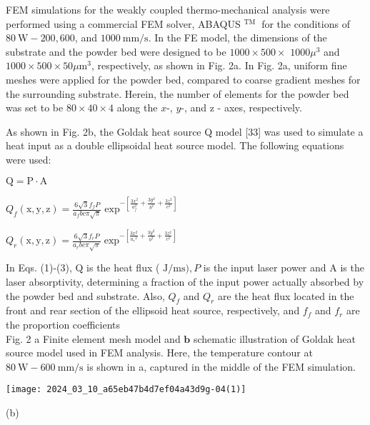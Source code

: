 \documentclass[10pt]{article}
\begin{document}
FEM simulations for the weakly coupled thermo-mechanical analysis were performed using a commercial FEM solver, ABAQUS ${ }^{\text {TM }}$ for the conditions of $80 \mathrm{~W}-200,600$, and $1000 \mathrm{~mm} / \mathrm{s}$. In the FE model, the dimensions of the substrate and the powder bed were designed to be $1000 \times 500 \times$ $1000 \mu^{3}$ and $1000 \times 500 \times 50 \mu \mathrm{m}^{3}$, respectively, as shown in Fig. 2a. In Fig. 2a, uniform fine meshes were applied for the powder bed, compared to coarse gradient meshes for the surrounding substrate. Herein, the number of elements for the powder bed was set to be $80 \times 40 \times 4$ along the $x$-, $y$-, and $\mathrm{z}$ - axes, respectively.

As shown in Fig. 2b, the Goldak heat source Q model [33] was used to simulate a heat input as a double ellipsoidal heat source model. The following equations were used:

$\mathrm{Q}=\mathrm{P} \cdot \mathrm{A}$

$Q_{f}(\mathrm{x}, \mathrm{y}, \mathrm{z})=\frac{6 \sqrt{3} f_{f} P}{a_{f} b c \pi \sqrt{\pi}} \exp ^{-\left[\frac{3 x^{2}}{a_{f}^{2}}+\frac{3 y^{2}}{b^{2}}+\frac{3 z^{2}}{c^{2}}\right]}$

$Q_{r}(\mathrm{x}, \mathrm{y}, \mathrm{z})=\frac{6 \sqrt{3} f_{r} P}{a_{r} b c \pi \sqrt{\pi}} \exp ^{-\left[\frac{3 x^{2}}{a_{r}{ }^{2}}+\frac{3 y^{2}}{b^{2}}+\frac{3 z^{2}}{c^{2}}\right]}$

In Eqs. (1)-(3), $\mathrm{Q}$ is the heat flux ( $\mathrm{J} / \mathrm{ms}), P$ is the input laser power and $\mathrm{A}$ is the laser absorptivity, determining a fraction of the input power actually absorbed by the powder bed and substrate. Also, $Q_{f}$ and $Q_{r}$ are the heat flux located in the front and rear section of the ellipsoid heat source, respectively, and $f_{f}$ and $f_{r}$ are the proportion coefficients\\
Fig. 2 a Finite element mesh model and $\mathbf{b}$ schematic illustration of Goldak heat source model used in FEM analysis. Here, the temperature contour at $80 \mathrm{~W}-600 \mathrm{~mm} / \mathrm{s}$ is shown in a, captured in the middle of the FEM simulation.

\begin{center}
\texttt{[image: 2024\_03\_10\_a65eb47b4d7ef04a43d9g-04(1)]}
\end{center}

(b)
\end{document}
